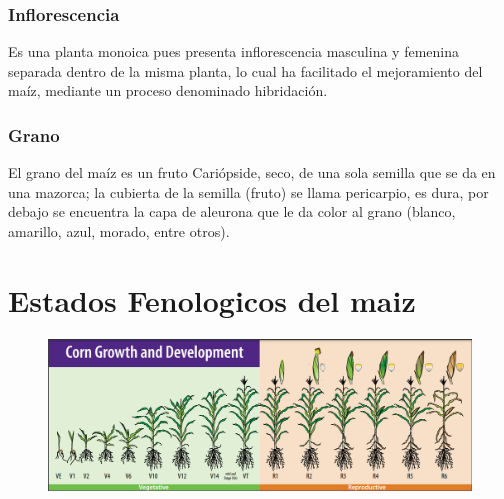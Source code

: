 \documentclass[utf8]{FrontiersinHarvard} %
\begin{document}
    \subsubsection{Inflorescencia} 
    Es una planta monoica pues presenta inflorescencia masculina y 
    femenina separada dentro de la misma planta, 
    lo cual ha facilitado el mejoramiento del maíz,  
    mediante un proceso denominado hibridación.

    
    \subsubsection{Grano} 
    El grano del maíz es un fruto Cariópside, seco, de una sola 
    semilla que se da en una mazorca; la cubierta de la semilla (fruto) 
    se llama pericarpio, es dura, por debajo se encuentra la capa de aleurona 
    que le da color al grano 
    (blanco, amarillo, azul, morado, entre otros). 


\section{Estados Fenologicos del maiz }
\begin{figure}[h]
    \centering
    \includegraphics[scale=.7]{./images/fenologia.png}
\end{figure}
\end{document}
